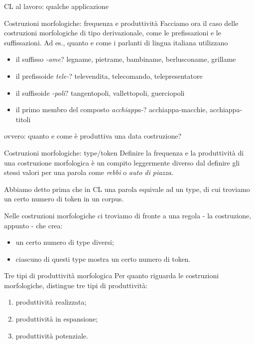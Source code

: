 \documentclass[pdf]{prosper}
\begin{document}
\begin{tsectionandpart}{CL al lavoro: qualche applicazione}
\begin{slide}{Costruzioni morfologiche: frequenza e produttività}
Facciamo ora il caso delle costruzioni morfologiche di tipo derivazionale, come le prefissazioni e le suffissazioni. Ad es., quanto e come i parlanti di lingua italiana utilizzano

	\begin{itemize}
		\item il suffisso {\it -ame}? legname, pietrame, bambiname, berlusconame, grillame 
		\item il prefissoide {\it tele-}? televendita, telecomando, telepresentatore
		\item il suffisoide {\it -poli}? tangentopoli, vallettopoli, guerciopoli
		\item il primo membro del composto {\it acchiappa-}? acchiappa-macchie, acchiappa-titoli
	\end{itemize}


ovvero: quanto e come è produttiva una data costruzione?

\end{slide}

\begin{slide}{Costruzioni morfologiche: type/token}
	Definire la frequenza e la produttività di una costruzione morfologica è un compito leggermente diverso dal definire gli stessi valori per una parola come {\it rebbi} o {\it auto di piazza}.

Abbiamo detto prima che in CL una parola equivale ad un type, di cui troviamo un certo numero di token in un corpus.

Nelle costruzioni morfologiche ci troviamo di fronte a una regola - la costruzione, appunto - che crea:

	\begin{itemize}
	\item un certo numero di type diversi;
	\item ciascuno di questi type mostra un certo numero di token.
	\end{itemize}
\end{slide}

\begin{slide}{Tre tipi di produttività morfologica}
Per quanto riguarda le costruzioni morfologiche, \citealt{Baayen2009} distingue tre tipi di produttività:

	\begin{enumerate}
		\item produttività realizzata;
		\item produttività in espansione;
		\item produttività potenziale.
	\end{enumerate}	


\end{slide}
\end{tsectionandpart}
\end{document}
